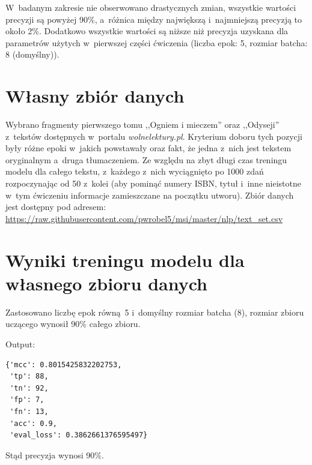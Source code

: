 \documentclass[12pt, a4paper]{mwart}
\begin{document}
W~badanym zakresie nie obserwowano drastycznych zmian, wszystkie wartości precyzji są powyżej 90\%, a~różnica między największą i~najmniejszą precyzją to około 2\%. Dodatkowo wszystkie wartości są niższe niż precyzja uzyskana dla parametrów użytych w~pierwszej części ćwiczenia (liczba epok: 5, rozmiar batcha: 8 (domyślny)).

\section{Własny zbiór danych}

Wybrano fragmenty pierwszego tomu ,,Ogniem i mieczem'' oraz ,,Odyseji'' z~tekstów dostępnych w~portalu \textit{wolnelektury.pl}. Kryterium doboru tych pozycji były różne epoki w~jakich powstawały oraz fakt, że jedna z~nich jest tekstem oryginalnym a~druga tłumaczeniem. Ze względu na zbyt długi czas treningu modelu dla całego tekstu, z~każdego z~nich wyciągnięto po 1000 zdań rozpoczynając od 50 z~kolei (aby pominąć numery ISBN, tytuł i~inne nieistotne w~tym ćwiczeniu informacje zamieszczane na początku utworu). Zbiór danych jest dostępny pod adresem: \url{https://raw.githubusercontent.com/pwrobel5/msi/master/nlp/text_set.csv}

\section{Wyniki treningu modelu dla własnego zbioru danych}

Zastosowano liczbę epok równą~5 i~domyślny rozmiar batcha (8), rozmiar zbioru uczącego wynosił 90\% całego zbioru.

Output:
\begin{lstlisting}
{'mcc': 0.8015425832202753, 
 'tp': 88, 
 'tn': 92, 
 'fp': 7, 
 'fn': 13, 
 'acc': 0.9, 
 'eval_loss': 0.3862661376595497}
\end{lstlisting}

Stąd precyzja wynosi 90\%.
\end{document}

